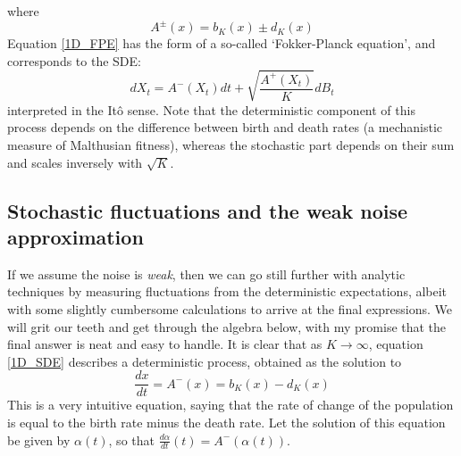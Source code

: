 where
\begin{equation*}
A^{\pm}(x) = b_K(x) \pm d_K(x)
\end{equation*}
Equation \eqref{1D_FPE} has the form of a so-called `Fokker-Planck equation', and corresponds to the SDE:
\begin{equation}
\label{1D_SDE}
dX_t = A^{-}(X_t)dt + \sqrt{\frac{A^{+}(X_t)}{K}}dB_t
\end{equation}
interpreted in the It\^{o} sense. Note that the deterministic component of this process depends on the difference between birth and death rates (a mechanistic measure of Malthusian fitness), whereas the stochastic part depends on their sum and scales inversely with $\sqrt{K}$.

\subsection{Stochastic fluctuations and the weak noise approximation}\label{sec_1D_WNA}
If we assume the noise is \emph{weak}, then we can go still further with analytic techniques by measuring fluctuations from the deterministic expectations, albeit with some slightly cumbersome calculations to arrive at the final expressions. We will grit our teeth and get through the algebra below, with my promise that the final answer is neat and easy to handle. It is clear that as $K \to \infty$, equation \eqref{1D_SDE} describes a deterministic process, obtained as the solution to
\begin{equation}
\label{1D_det_limit}
    \frac{dx}{dt} = A^{-}(x) = b_{K}(x) - d_{K}(x)
\end{equation}
This is a very intuitive equation, saying that the rate of change of the population is equal to the birth rate minus the death rate. Let the solution of this equation  be given by $\alpha(t)$, so that $\frac{d{\alpha}}{dt}(t) = A^{-}(\alpha(t))$.


